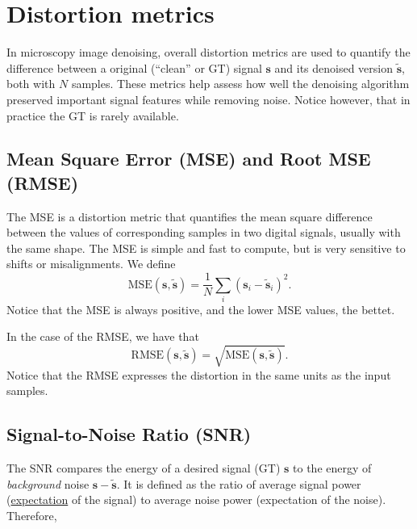 \chapter{Distortion metrics}
In microscopy image denoising, overall distortion metrics are used to
quantify the difference between a original (``clean'' or \gls{GT})
signal $\mathbf{s}$ and its denoised version $\tilde{\mathbf{s}}$,
both with $N$ samples. These metrics help assess how well the
denoising algorithm preserved important signal features while removing
noise. Notice however, that in practice the \gls{GT} is rarely
available.

\section{Mean Square Error (MSE) and Root MSE (RMSE)}

The \gls{MSE} is a distortion metric that quantifies the mean square
difference between the values of corresponding samples in two digital
signals, usually with the same shape. The \gls{MSE} is simple and fast to
compute, but is very sensitive to shifts or misalignments. We define
\begin{equation}
  \text{MSE}(\mathbf{s},\tilde{\mathbf{s}}) = \frac{1}{N}\sum_i(\mathbf{s}_i - \tilde{\mathbf{s}}_i)^2.
  \label{eq:MSE}
\end{equation}
Notice that the \gls{MSE} is always positive, and the lower
\gls{MSE} values, the bettet.

In the case of the \gls{RMSE}, we have that
\begin{equation}
  \text{RMSE}(\mathbf{s},\tilde{\mathbf{s}}) = \sqrt{\text{MSE}(\mathbf{s},\tilde{\mathbf{s}})}.
  \label{eq:RMSE}
\end{equation}
Notice that the \gls{RMSE} expresses the distortion in the same units as the
input samples.


\section{Signal-to-Noise Ratio (SNR)}

The \gls{SNR} compares the energy of a desired signal (\gls{GT})
$\mathbf{s}$ to the energy of \emph{background} noise
$\mathbf{s}-\tilde{\mathbf{s}}$. It is defined as the ratio of average signal
power
(\href{https://en.wikipedia.org/wiki/Expected_value}{expectation} of
the signal) to average noise power (expectation of the
noise). Therefore,

